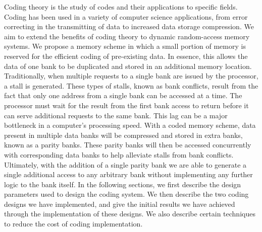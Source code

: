 Coding theory is the study of codes and their applications to specific fields. Coding has been used in a variety of computer science applications, from error correcting in the transmitting of data to increased data storage compression. We aim to extend the benefits of coding theory to dynamic random-access memory systems. We propose a memory scheme in which a small portion of memory is reserved for the efficient coding of pre-existing data. In essence, this allows the data of one bank to be duplicated and stored in an additional memory location. Traditionally, when multiple requests to a single bank are issued by the processor, a stall is generated. These types of stalls, known as bank conflicts, result from the fact that only one address from a single bank can be accessed at a time. The processor must wait for the result from the first bank access to return before it can serve additional requests to the same bank. This lag can be a major bottleneck in a computer's processing speed. With a coded memory scheme, data present in multiple data banks will be compressed and stored in extra banks, known as a parity banks. These parity banks will then be accessed concurrently with corresponding data banks to help alleviate stalls from bank conflicts. Ultimately, with the addition of a single parity bank we are able to generate a single additional access to any arbitrary bank without implementing any further logic to the bank itself.
In the following sections, we first describe the design parameters used to design the coding system. We then describe the two coding designs we have implemented, and give the initial results we have achieved through the implementation of these designs. We also describe certain techniques to reduce the cost of coding implementation.

